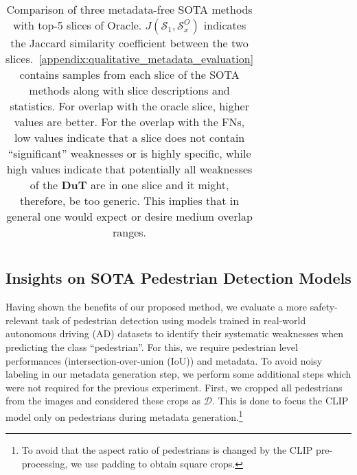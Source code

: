 \begin{table}
\begin{tabular}{@{}c|ccc|ccccc|c@{}}
    \end{tabular}
    \caption{Comparison of three metadata-free SOTA methods with top-5 slices of Oracle. $J(\mathcal S_1, \mathcal S^O_x)$ indicates the Jaccard similarity coefficient between the two slices.~\cref{appendix:qualitative_metadata_evaluation} contains samples from each slice of the SOTA methods along with slice descriptions and statistics. For overlap with the oracle slice, higher values are better. For the overlap with the FNs, low values indicate that a slice does not contain ``significant'' weaknesses or is highly specific, while high values indicate that potentially all weaknesses of the \textbf{DuT} are in one slice and it might, therefore, be too generic. This implies that in general one would expect or desire medium overlap ranges.}
    \label{tab:celebA_results}
\end{table}





\subsection{Insights on SOTA Pedestrian Detection Models}
\label{sec:results:ad_results}
Having shown the benefits of our proposed method, we evaluate a more safety-relevant task of pedestrian detection using models trained in real-world autonomous driving (AD) datasets to identify their systematic weaknesses when predicting the class ``pedestrian''. For this, we require pedestrian level performances (intersection-over-union (IoU)) and metadata.
To avoid noisy labeling in our metadata generation step, we perform some additional steps which were not required for the previous experiment. First, we cropped all pedestrians from the images and considered these crops as $\mathcal{D}$. This is done to focus the CLIP model only on pedestrians during metadata generation.\footnote{To avoid that the aspect ratio of pedestrians is changed by the CLIP pre-processing, we use padding to obtain square crops.} 



